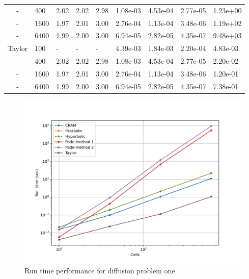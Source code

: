 \begin{table}[p]
{\begin{tabular}{cllllllll}
   - &  400 & 2.02 & 2.02 & 2.98 & 1.08e-03 & 4.53e-04 & 2.77e-05 & 1.23e+00 \\ 
   - & 1600 & 1.97 & 2.01 & 3.00 & 2.76e-04 & 1.13e-04 & 3.48e-06 & 1.19e+02 \\ 
   - & 6400 & 1.99 & 2.00 & 3.00 & 6.94e-05 & 2.82e-05 & 4.35e-07 & 9.48e+03 \\ 
   \hline
   Taylor       &  100 & - & - & - & 4.39e-03 & 1.84e-03 & 2.20e-04 & 4.83e-03 \\ 
   -      &  400 & 2.02 & 2.02 & 2.98 & 1.08e-03 & 4.53e-04 & 2.77e-05 & 2.20e-02 \\ 
   -      & 1600 & 1.97 & 2.01 & 3.00 & 2.76e-04 & 1.13e-04 & 3.48e-06 & 1.20e-01 \\ 
   -      & 6400 & 1.99 & 2.00 & 3.00 & 6.94e-05 & 2.82e-05 & 4.35e-07 & 7.38e-01 \\ 
   \hline
   \end{tabular}
   }
\end{table}

\clearpage

\begin{figure}[p]
    \centering
    \includegraphics[width=5in]{images/chapter-5/progressionProblems/problem1/diffusionProblem1Runtime.png}
    \caption{Run time performance for diffusion problem one}
    \label{fig:runtime_diffusion_one}
\end{figure}

\clearpage

